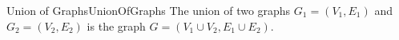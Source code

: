 \begin{mdef}{Union of Graphs}{UnionOfGraphs}
    The union of two graphs $G_1 = (V_1,E_1)$ and $G_2 = (V_2,E_2)$ is the graph $G = (V_1\cup V_2, E_1\cup E_2)$.
\end{mdef}